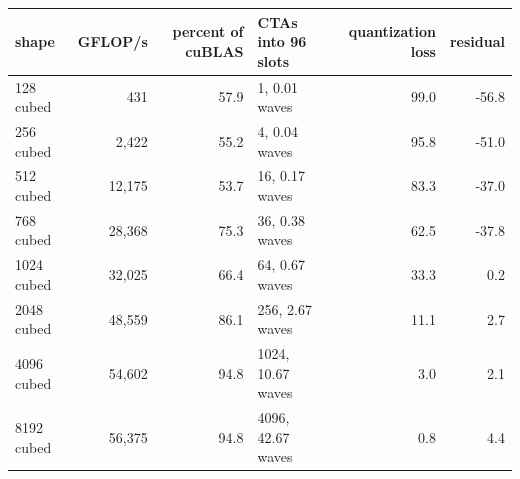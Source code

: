 \begin{tabular}{lrrlrr}
\toprule
shape & GFLOP/s & percent of cuBLAS & CTAs into 96 slots & quantization loss & residual \\
\midrule
128 cubed & 431 & 57.9 & 1, 0.01 waves & 99.0 & -56.8 \\
256 cubed & 2,422 & 55.2 & 4, 0.04 waves & 95.8 & -51.0 \\
512 cubed & 12,175 & 53.7 & 16, 0.17 waves & 83.3 & -37.0 \\
768 cubed & 28,368 & 75.3 & 36, 0.38 waves & 62.5 & -37.8 \\
1024 cubed & 32,025 & 66.4 & 64, 0.67 waves & 33.3 & 0.2 \\
2048 cubed & 48,559 & 86.1 & 256, 2.67 waves & 11.1 & 2.7 \\
4096 cubed & 54,602 & 94.8 & 1024, 10.67 waves & 3.0 & 2.1 \\
8192 cubed & 56,375 & 94.8 & 4096, 42.67 waves & 0.8 & 4.4 \\
\bottomrule
\end{tabular}
